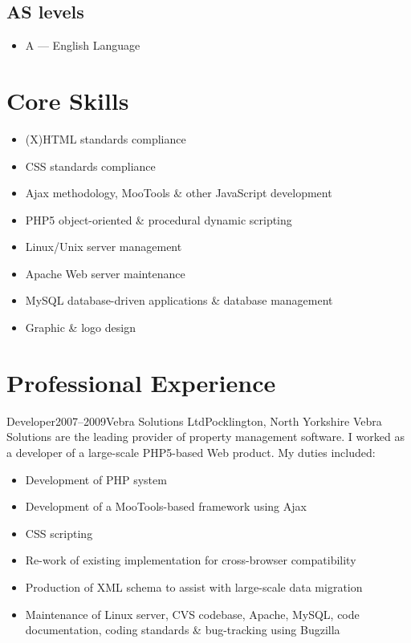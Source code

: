 \documentclass{cv}
\begin{document}
\subsection*{AS levels}

\begin{itemize}
\item A --- English Language
\end{itemize}

\section{Core Skills}

\begin{itemize}
\item (X)HTML standards compliance
\item CSS standards compliance
\item Ajax methodology, MooTools \& other JavaScript development
\item PHP5 object-oriented \& procedural dynamic scripting
\item Linux/Unix server management
\item Apache Web server maintenance
\item MySQL database-driven applications \& database management
\item Graphic \& logo design
\end{itemize}

\section{Professional Experience}

\begin{experience}{Developer}{2007--2009}{Vebra Solutions Ltd}{Pocklington, North Yorkshire}
Vebra Solutions are the leading provider of property management software. I worked as a developer of a large-scale PHP5-based Web product. My duties included:

\begin{itemize}
\item Development of PHP system
\item Development of a MooTools-based framework using Ajax
\item CSS scripting
\item Re-work of existing implementation for cross-browser compatibility
\item Production of XML schema to assist with large-scale data migration
\item Maintenance of Linux server, CVS codebase, Apache, MySQL, code documentation, coding standards \& bug-tracking using Bugzilla
\end{itemize}
\end{experience}
\end{document}
